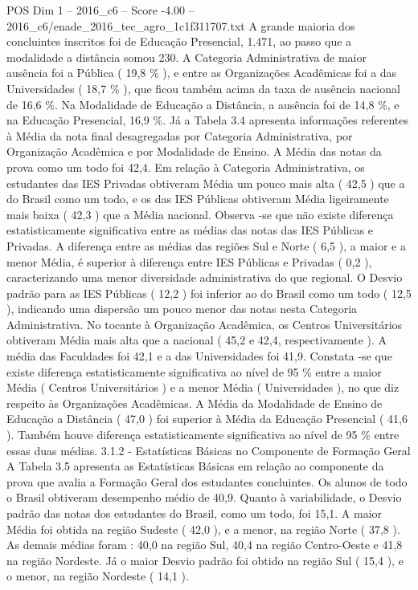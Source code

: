 \begin{textsample}{POS Dim 1 – 2016\_c6 – Score -4.00 – 2016\_c6/enade\_2016\_tec\_agro\_1c1f311707.txt}
A grande maioria dos concluintes inscritos foi de Educação Presencial, 1.471, ao passo que a modalidade a distância somou 230.
A Categoria Administrativa de maior ausência foi a Pública ( 19,8 \% ), e entre as Organizações Acadêmicas foi a das Universidades ( 18,7 \% ), que ficou também acima da taxa de ausência nacional de 16,6 \%.
Na Modalidade de Educação a Distância, a ausência foi de 14,8 \%, e na Educação Presencial, 16,9 \%.
Já a Tabela 3.4 apresenta informações referentes à Média da nota final desagregadas por Categoria Administrativa, por Organização Acadêmica e por Modalidade de Ensino.
A Média das notas da prova como um todo foi 42,4.
Em relação à Categoria Administrativa, os estudantes das IES Privadas obtiveram Média um pouco mais alta ( 42,5 ) que a do Brasil como um todo, e os das IES Públicas obtiveram Média ligeiramente mais baixa ( 42,3 ) que a Média nacional.
Observa -se que não existe diferença estatisticamente significativa entre as médias das notas das IES Públicas e Privadas.
A diferença entre as médias das regiões Sul e Norte ( 6,5 ), a maior e a menor Média, é superior à diferença entre IES Públicas e Privadas ( 0,2 ), caracterizando uma menor diversidade administrativa do que regional.
O Desvio padrão para as IES Públicas ( 12,2 ) foi inferior ao do Brasil como um todo ( 12,5 ), indicando uma dispersão um pouco menor das notas nesta Categoria Administrativa.
No tocante à Organização Acadêmica, os Centros Universitários obtiveram Média mais alta que a nacional ( 45,2 e 42,4, respectivamente ).
A média das Faculdades foi 42,1 e a das Universidades foi 41,9.
Constata -se que existe diferença estatisticamente significativa ao nível de 95 \% entre a maior Média ( Centros Universitários ) e a menor Média ( Universidades ), no que diz respeito às Organizações Acadêmicas.
A Média da Modalidade de Ensino de Educação a Distância ( 47,0 ) foi superior à Média da Educação Presencial ( 41,6 ).
Também houve diferença estatisticamente significativa ao nível de 95 \% entre essas duas médias. 3.1.2 - Estatísticas Básicas no Componente de Formação Geral A Tabela 3.5 apresenta as Estatísticas Básicas em relação ao componente da prova que avalia a Formação Geral dos estudantes concluintes.
Os alunos de todo o Brasil obtiveram desempenho médio de 40,9.
Quanto à variabilidade, o Desvio padrão das notas dos estudantes do Brasil, como um todo, foi 15,1.
A maior Média foi obtida na região Sudeste ( 42,0 ), e a menor, na região Norte ( 37,8 ).
As demais médias foram : 40,0 na região Sul, 40,4 na região Centro-Oeste e 41,8 na região Nordeste.
Já o maior Desvio padrão foi obtido na região Sul ( 15,4 ), e o menor, na região Nordeste ( 14,1 ).

\end{textsample}
